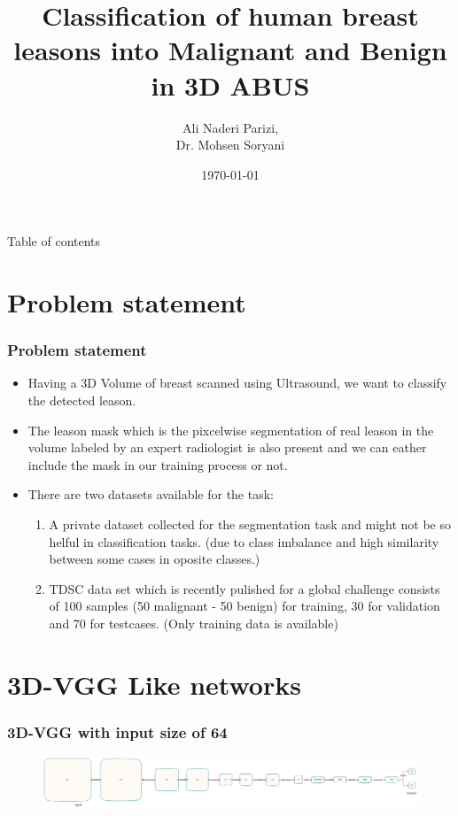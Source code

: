 \documentclass{beamer}
\title{Classification of human breast leasons into \textbf{M}alignant and \textbf{B}enign in 3D ABUS}
\author{Ali Naderi Parizi, \\Dr. Mohsen Soryani}
\date{\today}
\begin{document}
	
\frame{\titlepage} %


\begin{frame}{Table of contents}
\tableofcontents
\end{frame}

\section{Problem statement}
\begin{frame}
	\frametitle{Problem statement}
	\begin{itemize}
		\item Having a 3D Volume of breast scanned using Ultrasound, we want to classify the detected leason.
		\item The leason mask which is the pixcelwise segmentation of real leason in the volume labeled by an expert radiologist is also present and we can eather include the mask in our training process or not. 
		\item There are two datasets available for the task: 
		\begin{enumerate}
			\item A private dataset collected for the segmentation task and might not be so helful in classification tasks. (due to class imbalance and high similarity between some cases in oposite classes.) 
			\item TDSC data set which is recently pulished for a global challenge consists of 100 samples (50 malignant - 50 benign) for training, 30 for validation and 70 for testcases. (Only training data is available)
		\end{enumerate}	
	\end{itemize}
\end{frame}

\section{3D-VGG Like networks}


\begin{frame}
	\frametitle{3D-VGG with input size of 64}
	\begin{center}
		\begin{figure}
			\includegraphics[scale=0.14]{3d-vgg.png}
			\centering
		\end{figure}
	\end{center}		
\end{frame}
\end{document}

